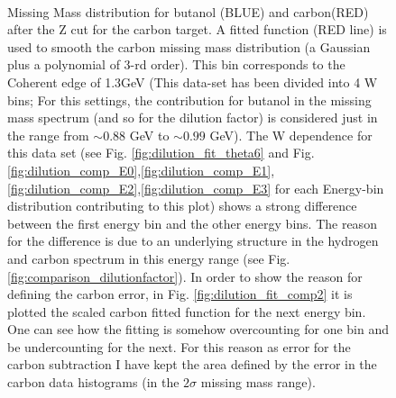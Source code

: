 \begin{figure}[htb]
  \begin{center}
     \\
    \caption{Missing Mass distribution for butanol (BLUE) and carbon(RED) after the Z cut for the carbon target. A fitted function (RED line)  is used to smooth the carbon missing mass distribution (a Gaussian plus a polynomial of 3-rd order). This bin corresponds to the Coherent edge of 1.3GeV (This data-set has been divided into 4 W bins; For this settings, the contribution for butanol in the missing mass spectrum (and so for the dilution factor) is considered just in the range from $\sim 0.88$ GeV to $\sim 0.99$ GeV). The W dependence for this data set (see Fig. \ref{fig:dilution_fit_theta6} and Fig. \ref{fig:dilution_comp_E0},\ref{fig:dilution_comp_E1},\ref{fig:dilution_comp_E2},\ref{fig:dilution_comp_E3} for each Energy-bin distribution contributing to this plot) shows a strong difference between the first energy bin and the other energy bins. The reason for the difference is due to an underlying structure in the hydrogen and carbon spectrum in this energy range (see Fig. \ref{fig:comparison_dilutionfactor}). In order to show the reason for defining the carbon error, in Fig. \ref{fig:dilution_fit_comp2} it is plotted the scaled carbon fitted function for the next energy bin. One can see how the fitting is somehow overcounting for one bin and be undercounting for the next. For this reason as error for the carbon subtraction I have kept the area defined by the error in the carbon data histograms (in the $2\sigma$ missing mass range). \\
}
\end{center}
\end{figure}
